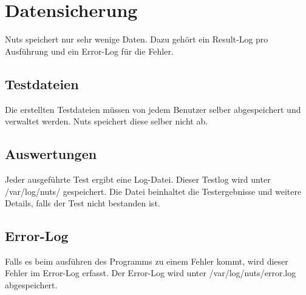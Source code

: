 \documentclass[a4,12pt]{scrartcl}
\begin{document}
\newpage
\section{Datensicherung}
Nuts speichert nur sehr wenige Daten. Dazu gehört ein Result-Log pro Ausführung und ein Error-Log für die Fehler.
\subsection{Testdateien}
Die erstellten Testdateien müssen von jedem Benutzer selber abgespeichert und verwaltet werden. Nuts speichert diese selber nicht ab.
\subsection{Auswertungen}
Jeder ausgeführte Test ergibt eine Log-Datei. Dieser Testlog wird unter /var/log/nuts/ gespeichert. Die Datei beinhaltet die Testergebnisse und weitere Details, falls der Test nicht bestanden ist.
\subsection{Error-Log}
Falls es beim ausführen des Programms zu einem Fehler kommt, wird dieser Fehler im Error-Log erfasst. Der Error-Log wird unter /var/log/nuts/error.log abgespeichert.
\end{document}
